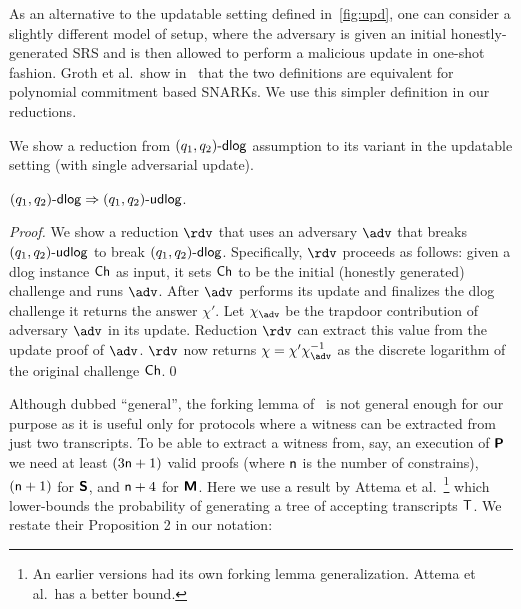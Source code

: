\begin{remark}\label{rem:upd}
	As an alternative to the updatable setting defined in~\cref{fig:upd}, one can consider a slightly different model of setup, where the adversary is given an initial honestly-generated SRS and is then allowed to perform a malicious update in one-shot fashion.
	Groth
	et al.\ show in~\cite{C:GKMMM18} that the two definitions are equivalent for polynomial commitment based SNARKs. We use this simpler definition in our reductions.
\end{remark}


We show a reduction from $(q_1, q_2)\text{-}\mathsf{dlog}$ assumption to its variant in the updatable setting (with single adversarial update). 
\begin{lemma}
	$(q_1, q_2)\text{-}\mathsf{dlog} \Rightarrow (q_1, q_2)\text{-}\mathsf{udlog}$.
	\end{lemma}
\begin{proof}
	We show a reduction $\reduction$ that uses an adversary $\adv$ that breaks $(q_1, q_2)\text{-}\mathsf{udlog}$ to break $(q_1, q_2)\text{-}\mathsf{dlog}$. Specifically, $\reduction$ proceeds as follows: given a dlog instance $\mathsf{Ch}$ as input, it sets $\mathsf{Ch}$ to be the initial (honestly generated) challenge and runs $\adv$. After $\adv$ performs its update and finalizes the dlog challenge it returns the answer $\chi'$. Let $\chi_\adv$ be the trapdoor contribution of adversary $\adv$ in its update. Reduction $\reduction$ can extract this value from the update proof of $\adv$. $\reduction$ now returns $\chi = \chi' \chi_\adv^{-1}$ as the discrete logarithm of the original challenge $\mathsf{Ch}$.\qed
	\end{proof}


Although dubbed ``general'', the forking lemma of~\cite{CCS:BelNev06} is not general enough for our purpose as it is useful only for protocols where a witness can be extracted from just two transcripts. To be able to extract a witness from, say, an execution of $\bm{\mathsf{P}}$ we need at least $(3 \mathsf{n} + 1)$ valid proofs (where $\mathsf{n}$ is the number of constrains), $(\mathsf{n}+ 1)$ for $\bm{\mathsf{S}}$, and $\mathsf{n} + 4$ for $\bm{\mathsf{M}}$. Here we use a result by Attema et
al.~\cite{EPRINT:AttFehKlo21short}\footnote{An earlier versions had its own forking lemma generalization. Attema et al.\ has a better bound.}  which lower-bounds the probability of generating a tree of accepting transcripts $\mathsf{T}$. We restate their Proposition 2 in our notation:

